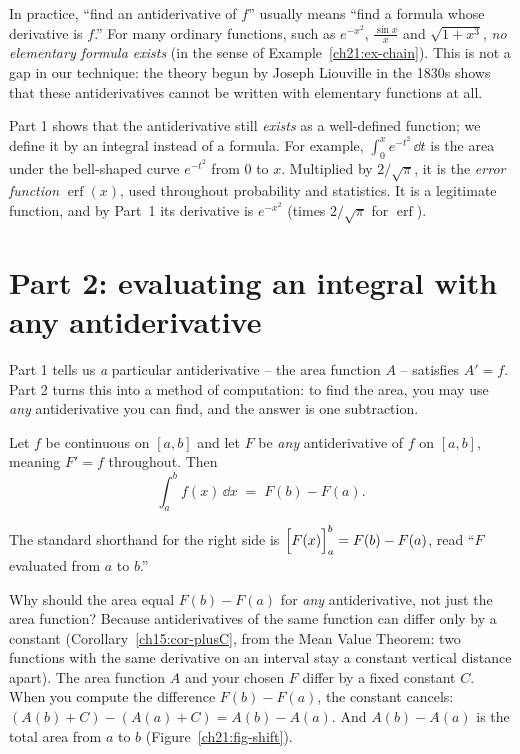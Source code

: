\begin{aestheticbox}
In practice, ``find an antiderivative of $f$'' usually means ``find a formula
whose derivative is $f$.'' For many ordinary functions, such as $e^{-x^2}$,
$\frac{\sin x}{x}$ and $\sqrt{1+x^3}$, \emph{no elementary formula exists} (in the
sense of Example~\ref{ch21:ex-chain}). This is not a gap in our technique: the
theory begun by Joseph Liouville in the 1830s shows that these antiderivatives
cannot be written with elementary functions at all.

Part 1 shows that the antiderivative still \emph{exists} as a well-defined
function; we define it by an integral instead of a formula. For example,
$\int_0^x e^{-t^2}\,\dd t$ is the area under the bell-shaped curve $e^{-t^2}$ from
$0$ to $x$. Multiplied by $2/\sqrt{\pi}$, it is the \emph{error function}
$\operatorname{erf}(x)$, used throughout probability and statistics. It is a
legitimate function, and by Part~1 its derivative is $e^{-x^2}$ (times
$2/\sqrt{\pi}$ for $\operatorname{erf}$).
\end{aestheticbox}

\section{Part 2: evaluating an integral with any antiderivative}

Part 1 tells us \emph{a} particular antiderivative -- the area function $A$ --
satisfies $A'=f$. Part 2 turns this into a method of computation: to find the
area, you may use \emph{any} antiderivative you can find, and the
answer is one subtraction.

\begin{theorem}\label{ch21:thm-ftc2}
Let $f$ be continuous on $[a,b]$ and let $F$ be \emph{any} antiderivative of $f$
on $[a,b]$, meaning $F'=f$ throughout. Then
\[
  \int_a^b f(x)\,\dd x \;=\; F(b)-F(a).
\]
\end{theorem}

The standard shorthand for the right side is $\Big[F(x)\Big]_{a}^{b}=F(b)-F(a)$, read
``$F$ evaluated from $a$ to $b$.''

\begin{intuitionbox}
Why should the area equal $F(b)-F(a)$ for \emph{any} antiderivative, not just the
area function? Because antiderivatives of the same function can differ only by a
constant (Corollary~\ref{ch15:cor-plusC}, from the Mean Value Theorem: two
functions with the same derivative on an interval stay a constant vertical
distance apart). The area function $A$
and your chosen $F$ differ by a fixed constant $C$. When you compute the
difference $F(b)-F(a)$, the constant cancels: $(A(b)+C)-(A(a)+C)=A(b)-A(a)$. And
$A(b)-A(a)$ is the total area from $a$ to $b$ (Figure~\ref{ch21:fig-shift}).
\end{intuitionbox}

